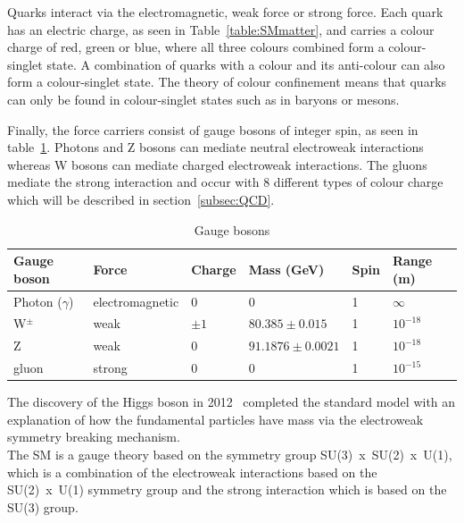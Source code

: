 Quarks interact via the electromagnetic, weak force or strong force. Each quark has an electric charge, as seen in Table~\ref{table:SMmatter}, and carries a colour charge of red, green or blue, where all three colours combined form a colour-singlet state. A combination of quarks with a colour and its anti-colour can also form a colour-singlet state. The theory of colour confinement means that quarks can only be found in colour-singlet states such as in baryons or mesons. 

Finally, the force carriers consist of gauge bosons of integer spin, as seen in table~\ref{table:SMbosons}. Photons and Z bosons can mediate neutral electroweak interactions whereas W bosons can mediate charged electroweak interactions. The gluons mediate the strong interaction and occur with 8 different types of colour charge which will be described in section~\ref{subsec:QCD}. 
\begin{table}[ht!]
\centering
\caption{Gauge bosons}
\footnotesize
\label{table:SMbosons}
\begin{tabular}{|l|l|l|l|l|l|}
\hline
Gauge boson                       & Force           & Charge & Mass (GeV) & Spin & Range (m)  \\ \hline \hline
Photon ($\gamma$)                 & electromagnetic & 0      & 0          & 1    & $\infty$   \\ \hline
W$^{\pm}$                         & weak            & $\pm1$ & $80.385\pm0.015$           & 1    & $10^{-18}$ \\ \hline
Z                                 & weak            & 0      & $91.1876\pm0.0021$           & 1    & $10^{-18}$ \\ \hline
gluon                             & strong          & 0      & 0          & 1    & $10^{-15}$ \\ \hline
\end{tabular}
\end{table}

The discovery of the Higgs boson in 2012~\cite{Higgs2012observation} completed the standard model with an explanation of how the fundamental particles have mass via the electroweak symmetry breaking mechanism.\\

The SM is a gauge theory based on the symmetry group SU(3)~x~SU(2)~x~U(1), which is a combination of the electroweak interactions based on the SU(2)~x~U(1) symmetry group and the strong interaction which is based on the SU(3) group.

